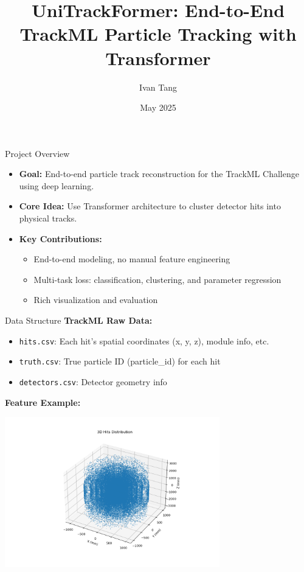 \documentclass{beamer}
\title{UniTrackFormer: End-to-End TrackML Particle Tracking with Transformer}
\author{Ivan Tang}
\date{May 2025}
\begin{document}
\begin{frame}
  \titlepage
\end{frame}

\begin{frame}{Project Overview}
  \begin{itemize}
    \item \textbf{Goal:} End-to-end particle track reconstruction for the TrackML Challenge using deep learning.
    \item \textbf{Core Idea:} Use Transformer architecture to cluster detector hits into physical tracks.
    \item \textbf{Key Contributions:}
    \begin{itemize}
      \item End-to-end modeling, no manual feature engineering
      \item Multi-task loss: classification, clustering, and parameter regression
      \item Rich visualization and evaluation
    \end{itemize}
  \end{itemize}
\end{frame}

\begin{frame}{Data Structure}
  \textbf{TrackML Raw Data:}
  \begin{itemize}
    \item \texttt{hits.csv}: Each hit's spatial coordinates (x, y, z), module info, etc.
    \item \texttt{truth.csv}: True particle ID (particle\_id) for each hit
    \item \texttt{detectors.csv}: Detector geometry info
  \end{itemize}
  \vspace{0.5em}
  \textbf{Feature Example:}
  \begin{center}
    \includegraphics[width=0.7\textwidth]{../../results/3d_hits.png}
  \end{center}
\end{frame}
\end{document}
